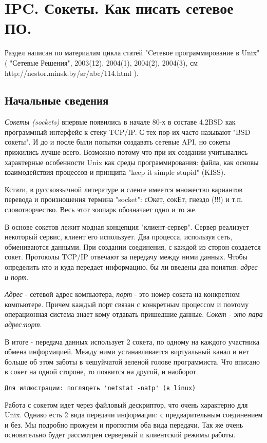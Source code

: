 \chapter{IPC. Сокеты. Как писать сетевое ПО.}

Раздел написан по материалам цикла статей "Cетевое программирование в Unix" ( "Сетевые Решения", 2003(12), 2004(1), 2004(2), 2004(3), см http://nestor.minsk.by/sr/abc/114.html ).

\section{Начальные сведения}

\emph{Сокеты (sockets)} впервые появились в начале 80-х в составе 4.2BSD как программный интерфейс к стеку TCP/IP. С тех пор их часто называют "BSD сокеты". И до и после были попытки создавать сетевые API, но сокеты прижились лучше всего. Возможно потому что при их создании учитывались характерные особенности Unix как среды программирования: файла, как основы взаимодействия процессов и принципа "keep it simple stupid" (KISS).

Кстати, в русскоязычной литературе и сленге имеется множество вариантов перевода и произношения термина "socket": сОкет, сокЕт, гнездо (!!!) и т.п. словотворчество. Весь этот зоопарк обозначает одно и то же.

В основе сокетов лежит модная концепция "клиент-сервер". Сервер реализует некоторый сервис, клиент его использует. Два процесса, используя сеть, обмениваются данными. При создании соединения, с каждой из сторон создается сокет. Протоколы TCP/IP отвечают за передачу между ними данных. Чтобы определить кто и куда передает информацию, бы ли введены два понятия: \emph{адрес и порт}. 

\emph{Адрес} - сетевой адрес компьютера, \emph{порт} - это номер сокета на конкретном компьютере. Причем каждый порт связан с конкретным процессом и поэтому операционная система знает кому отдавать пришедшие данные. \emph{Сокет - это пара адрес:порт}.

В итоге - передача данных использует 2 сокета, по одному на каждого участника обмена информацией. Между ними устанавливается виртуальный канал и нет больше об этом заботы в чешуйчатой зеленой голове программиста. Что вписано в сокет на одной стороне, то появится на другой, и наоборот.

\verb+Для иллюстрации: поглядеть 'netstat -natp' (в linux)+

Работа с сокетом идет через файловый дескриптор, что очень характерно для Unix.
Однако есть 2 вида передачи информации: с предварительным соединением и без. Мы подробно прожуем и проглотим оба вида передачи. Так же очень основательно будет рассмотрен серверный и клиентский режимы работы.

